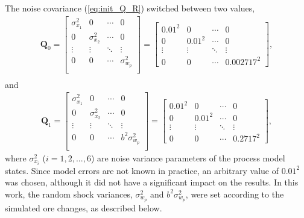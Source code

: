 The noise covariance (\ref{eq:init_Q_R}) switched between two values,
\begin{equation} \label{eq:Q0}
	\begin{aligned}
		\mathbf{Q}_0=\begin{bmatrix}
			\sigma_{x_1}^2 & 0 & \cdots & 0 \\
			0 & \sigma_{x_2}^2 & \cdots & 0 \\
			\vdots & \vdots & \ddots & \vdots \\
			0 & 0 & \cdots & \sigma_{w_p}^2 \\
		\end{bmatrix}=\begin{bmatrix}
			0.01^2 & 0 & \cdots & 0 \\
			0 & 0.01^2 & \cdots & 0 \\
			\vdots & \vdots & \ddots & \vdots \\
			0 & 0 & \cdots & 0.002717^2
		\end{bmatrix}, \\
	\end{aligned}
\end{equation}
and 
\begin{equation} \label{eq:Q1}
	\begin{aligned}
		\mathbf{Q}_1=\begin{bmatrix}
			\sigma_{x_1}^2 & 0 & \cdots & 0 \\
			0 & \sigma_{x_2}^2 & \cdots & 0 \\
			\vdots & \vdots & \ddots & \vdots \\
			0 & 0 & \cdots & b^2\sigma_{w_p}^2 \\
		\end{bmatrix}=\begin{bmatrix}
			0.01^2 & 0 & \cdots & 0 \\
			0 & 0.01^2 & \cdots & 0 \\
			\vdots & \vdots & \ddots & \vdots \\
			0 & 0 & \cdots & 0.2717^2
		\end{bmatrix},
	\end{aligned}
\end{equation}
where $\sigma_{x_i}^2$ ($i=1,2,...,6$) are noise variance parameters of the process model states. Since model errors are not known in practice, an arbitrary value of $0.01^2$ was chosen, although it did not have a significant impact on the results. In this work, the random shock variances, $\sigma_{w_p}^2$ and $b^2\sigma_{w_p}^2$, were set according to the simulated ore changes, as described below.

